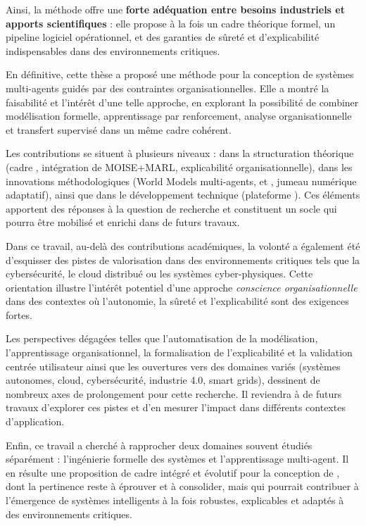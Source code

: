 \medskip
\noindent
Ainsi, la méthode  offre une \textbf{forte adéquation entre besoins industriels et apports scientifiques} :
elle propose à la fois un cadre théorique formel, un pipeline logiciel opérationnel, et des garanties de sûreté et d'explicabilité indispensables dans des environnements critiques.

\bigskip
\noindent
\medskip
\noindent
En définitive, cette thèse a proposé une méthode pour la conception de systèmes multi-agents guidés par des contraintes organisationnelles.
Elle a montré la faisabilité et l’intérêt d’une telle approche, en explorant la possibilité de combiner modélisation formelle, apprentissage par renforcement, analyse organisationnelle et transfert supervisé dans un même cadre cohérent.

\medskip
\noindent
Les contributions se situent à plusieurs niveaux : dans la structuration théorique (cadre , intégration de MOISE+MARL, explicabilité organisationnelle), dans les innovations méthodologiques (World Models multi-agents,  et , jumeau numérique adaptatif), ainsi que dans le développement technique (plateforme ).
Ces éléments apportent des réponses à la question de recherche et constituent un socle qui pourra être mobilisé et enrichi dans de futurs travaux.

\medskip
\noindent
Dans ce travail, au-delà des contributions académiques, la volonté a également été d’esquisser des pistes de valorisation dans des environnements critiques tels que la cybersécurité, le cloud distribué ou les systèmes cyber-physiques.
Cette orientation illustre l’intérêt potentiel d’une approche \textit{conscience organisationnelle} dans des contextes où l’autonomie, la sûreté et l’explicabilité sont des exigences fortes.

\medskip
\noindent
Les perspectives dégagées telles que l’automatisation de la modélisation, l'apprentissage organisationnel, la formalisation de l’explicabilité et la validation centrée utilisateur ainsi que les ouvertures vers des domaines variés (systèmes autonomes, cloud, cybersécurité, industrie 4.0, smart grids), dessinent de nombreux axes de prolongement pour cette recherche.
Il reviendra à de futurs travaux d’explorer ces pistes et d’en mesurer l’impact dans différents contextes d’application.

\medskip
\noindent
Enfin, ce travail a cherché à rapprocher deux domaines souvent étudiés séparément : l’ingénierie formelle des systèmes et l’apprentissage multi-agent.
Il en résulte une proposition de cadre intégré et évolutif pour la conception de , dont la pertinence reste à éprouver et à consolider, mais qui pourrait contribuer à l’émergence de systèmes intelligents à la fois robustes, explicables et adaptés à des environnements critiques.


\clearpage
\thispagestyle{empty}
\null
\newpage
